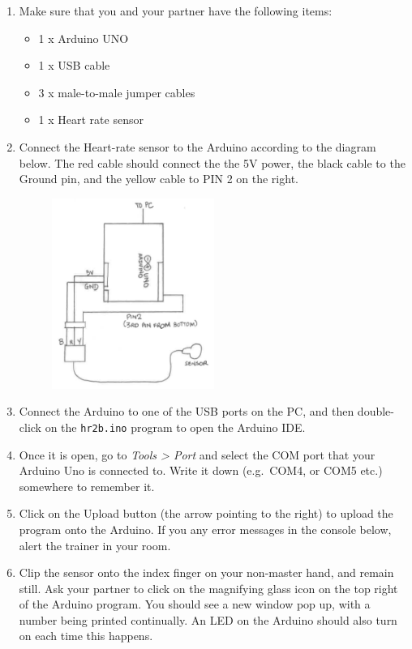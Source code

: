 \documentclass[11pt]{article}
\providecommand{\tightlist}{%
  \setlength{\itemsep}{0pt}\setlength{\parskip}{0pt}}
\begin{document}
\begin{enumerate}
\def\labelenumi{\arabic{enumi}.}
\tightlist
\item
  Make sure that you and your partner have the following items:

  \begin{itemize}
  \tightlist
  \item
    1 x Arduino UNO
  \item
    1 x USB cable
  \item
    3 x male-to-male jumper cables
  \item
    1 x Heart rate sensor
  \end{itemize}
\item
  Connect the Heart-rate sensor to the Arduino according to the diagram
  below. The red cable should connect the the 5V power, the black cable
  to the Ground pin, and the yellow cable to PIN 2 on the right.
  \begin{figure}[H]
  \begin{center}
  \includegraphics[width=0.5\textwidth]{../arduino_setup_yr19.png}
  \end{center}
  \end{figure}
\item
  Connect the Arduino to one of the USB ports on the PC, and then
  double-click on the \texttt{hr2b.ino} program to open the Arduino IDE.
\item
  Once it is open, go to \emph{Tools \textgreater{} Port} and select the
  COM port that your Arduino Uno is connected to. Write it down
  (e.g.~COM4, or COM5 etc.) somewhere to remember it.
\item
  Click on the Upload button (the arrow pointing to the right) to upload
  the program onto the Arduino. If you any error messages in the console
  below, alert the trainer in your room.
\item
  Clip the sensor onto the index finger on your non-master hand, and
  remain still. Ask your partner to click on the magnifying glass icon
  on the top right of the Arduino program. You should see a new window
  pop up, with a number being printed continually. An LED on the Arduino
  should also turn on each time this happens.
\end{enumerate}
\end{document}

